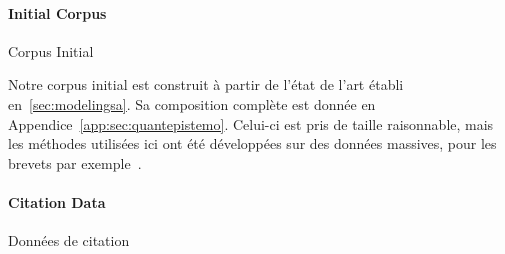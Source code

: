 \paragraph{Initial Corpus}{Corpus Initial}

Notre corpus initial est construit à partir de l'état de l'art établi en~\ref{sec:modelingsa}. Sa composition complète est donnée en Appendice~\ref{app:sec:quantepistemo}. Celui-ci est pris de taille raisonnable, mais les méthodes utilisées ici ont été développées sur des données massives, pour les brevets par exemple~\cite{bergeaud2017classifying}.


\paragraph{Citation Data}{Données de citation}


